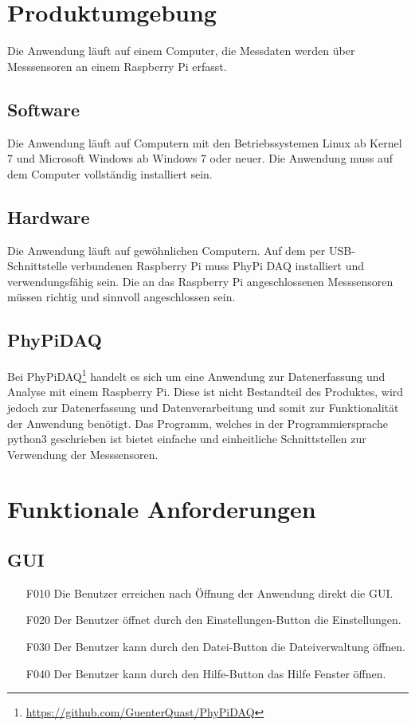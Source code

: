 \documentclass[parskip=full]{scrartcl}
\begin{document}
\section{Produktumgebung}

Die Anwendung läuft auf einem Computer, die Messdaten werden über Messsensoren an einem Raspberry Pi erfasst.

\subsection{Software}

Die Anwendung läuft auf Computern mit den Betriebssystemen Linux ab Kernel 7 und Microsoft Windows ab Windows 7 oder neuer. Die Anwendung muss auf dem Computer vollständig installiert sein. 

\subsection{Hardware}

Die Anwendung läuft auf gewöhnlichen Computern.
Auf dem per USB-Schnittstelle verbundenen Raspberry Pi muss PhyPi DAQ installiert und verwendungsfähig sein.
Die an das Raspberry Pi angeschlossenen Messsensoren müssen richtig und sinnvoll angeschlossen sein.

\subsection{PhyPiDAQ}

Bei PhyPiDAQ\footnote{\url{https://github.com/GuenterQuast/PhyPiDAQ}} handelt es sich um eine Anwendung zur Datenerfassung und Analyse mit einem Raspberry Pi. Diese ist nicht Bestandteil des Produktes, wird jedoch zur Datenerfassung und Datenverarbeitung und somit zur Funktionalität der Anwendung  benötigt. Das Programm, welches in der Programmiersprache python3 geschrieben ist bietet einfache und einheitliche Schnittstellen zur Verwendung der Messsensoren.

\section{Funktionale Anforderungen}

\subsection{GUI}

\begin{itemize}
\item[F010] Die Benutzer erreichen nach Öffnung der Anwendung direkt die GUI.
\item[F020] Der Benutzer öffnet durch den Einstellungen-Button die Einstellungen.
\item[F030] Der Benutzer kann durch den Datei-Button die Dateiverwaltung öffnen.
\item[F040] Der Benutzer kann durch den Hilfe-Button das Hilfe Fenster öffnen.
\end{itemize}
\end{document}
